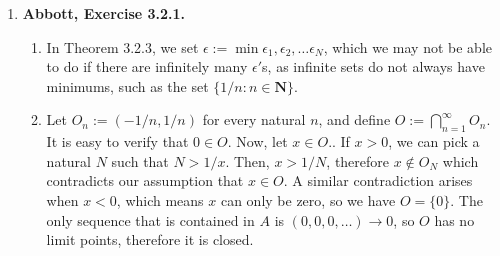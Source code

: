 \documentclass{article}
\DeclarePairedDelimiter\abs{\lvert}{\rvert}
\newcommand{\N}{\mathbf{N}}
\newcommand{\R}{\mathbf{R}}
\newcommand{\set}[1]{\{#1\}}
\newcommand{\exc}[2][Abbott]{\item \textbf{#1, Exercise #2.}}
\newcommand{\lep}[1][L]{#1et $\epsilon > 0$ be arbitrary}
\begin{document}
\begin{enumerate}
\begin{enumerate}
        While in the previous proof we used the fact that $(s_n)$ converges to prove that
        \begin{equation*}
            \sum_{k=1}^\infty s_k(y_k-y_{k+1})
        \end{equation*} converges, we really only needed $(s_n)$ to be bounded, so the same proof applies. The other slight difference is when we applied the Algebraic Limit Theorem to show that $s_n y_{n+1}$ converges. This does not work here, since $(s_n)$ does not necessarily converge. To see that this is not a problem, \lep. Let $M \in \R$ be a bound for $(s_n)$. Use the fact that $(y_n) \to 0$ to choose $N \in \N$ such that $\abs*{y_n} < \epsilon/M$ for all $n \geq M$. Then, $\abs*{s_n y_{n+1}} \leq M \abs*{y_{n+1}} < \epsilon$, therefore $(s_n y_{n+1}) \to 0$. For the same reason as before, this means that
        \begin{equation*}
            \sum_{k=1}^\infty x_k y_k
        \end{equation*} converges.
        
        \item Let $(x_k) = (-1)^{k+1}$ and $(y_n) \to 0$ be decreasing. Notice that the partial sums of $(x_k)$ are bounded by $1$. By Dirichlet's Test, 
        \begin{equation*}
            \sum_{k=1}^\infty (-1)^{k+1} y_n
        \end{equation*} converges.
    \end{enumerate}
    
    \exc{3.2.1}
    \begin{enumerate}
        \item In Theorem 3.2.3, we set $\epsilon := \min{\epsilon_1, \epsilon_2, \dots 
        \epsilon_N}$, which we may not be able to do if there are infinitely many $\epsilon'$s, as infinite sets do not always have minimums, such as the set $\set{1/n : n \in \N}$.
        
        \item Let $O_n := (-1/n, 1/n)$ for every natural $n$, and define $O := \bigcap_{n=1}^\infty O_n$. It is easy to verify that $0 \in O$. Now, let $x \in O$.. If $x > 0$, we can pick a natural $N$ such that $N > 1/x$. Then, $x > 1/N$, therefore $x \notin O_N$ which contradicts our assumption that $x \in O$. A similar contradiction arises when $x < 0$, which means $x$ can only be zero, so we have $O = \set{0}$. The only sequence that is contained in $A$ is $(0, 0, 0, \dots) \to 0$, so $O$ has no limit points, therefore it is closed.
    \end{enumerate}
    

\end{enumerate}
\end{document}
